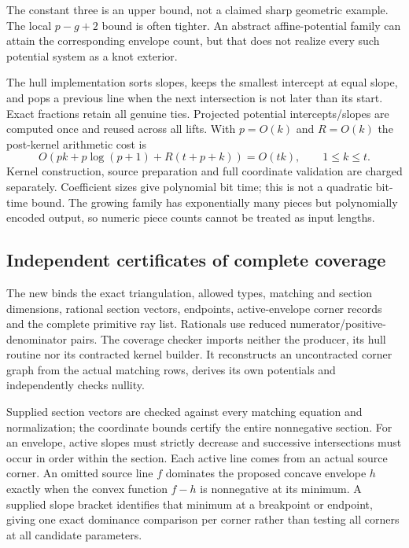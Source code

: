 The constant three is an upper bound, not a claimed sharp geometric example.
The local $p-g+2$ bound is often tighter. An abstract affine-potential family
can attain the corresponding envelope count, but that does not realize every
such potential system as a knot exterior.

The hull implementation sorts slopes, keeps the smallest intercept at equal
slope, and pops a previous line when the next intersection is not later than
its start. Exact fractions retain all genuine ties. Projected potential
intercepts/slopes are computed once and reused across all lifts. With
$p=O(k)$ and $R=O(k)$ the post-kernel arithmetic cost is
\[
 O(pk+p\log(p+1)+R(t+p+k))=O(tk),\qquad1\le k\le t.
\]
Kernel construction, source preparation and full coordinate validation are
charged separately. Coefficient sizes give polynomial bit time; this is not
a quadratic bit-time bound. The growing family has exponentially many
pieces but polynomially encoded output, so numeric piece counts cannot be
treated as input lengths.

\subsection{Independent certificates of complete coverage}

The new  binds the exact triangulation,
allowed types, matching and section dimensions, rational section vectors,
endpoints, active-envelope corner records and the complete primitive ray list.
Rationals use reduced numerator/positive-denominator pairs. The coverage
checker imports neither the producer, its hull routine nor its contracted
kernel builder. It reconstructs an uncontracted corner graph from the actual
matching rows, derives its own potentials and independently checks nullity.

Supplied section vectors are checked against every matching equation and
normalization; the coordinate bounds certify the entire nonnegative section.
For an envelope, active slopes must strictly decrease and successive
intersections must occur in order within the section. Each active line comes
from an actual source corner. An omitted source line $f$ dominates the
proposed concave envelope $h$ exactly when the convex function $f-h$ is
nonnegative at its minimum. A supplied slope bracket identifies that minimum
at a breakpoint or endpoint, giving one exact dominance comparison per
corner rather than testing all corners at all candidate parameters.

